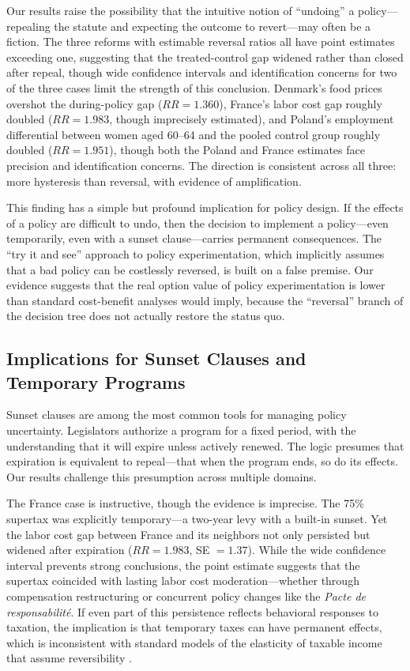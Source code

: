 \documentclass[12pt]{article}
\begin{document}
Our results raise the possibility that the intuitive notion of ``undoing'' a policy---repealing the statute and expecting the outcome to revert---may often be a fiction. The three reforms with estimable reversal ratios all have point estimates exceeding one, suggesting that the treated-control gap widened rather than closed after repeal, though wide confidence intervals and identification concerns for two of the three cases limit the strength of this conclusion. Denmark's food prices overshot the during-policy gap ($RR = 1.360$), France's labor cost gap roughly doubled ($RR = 1.983$, though imprecisely estimated), and Poland's employment differential between women aged 60--64 and the pooled control group roughly doubled ($RR = 1.951$), though both the Poland and France estimates face precision and identification concerns. The direction is consistent across all three: more hysteresis than reversal, with evidence of amplification.

This finding has a simple but profound implication for policy design. If the effects of a policy are difficult to undo, then the decision to implement a policy---even temporarily, even with a sunset clause---carries permanent consequences. The ``try it and see'' approach to policy experimentation, which implicitly assumes that a bad policy can be costlessly reversed, is built on a false premise. Our evidence suggests that the real option value of policy experimentation is lower than standard cost-benefit analyses would imply, because the ``reversal'' branch of the decision tree does not actually restore the status quo.

\subsection{Implications for Sunset Clauses and Temporary Programs}

Sunset clauses are among the most common tools for managing policy uncertainty. Legislators authorize a program for a fixed period, with the understanding that it will expire unless actively renewed. The logic presumes that expiration is equivalent to repeal---that when the program ends, so do its effects. Our results challenge this presumption across multiple domains.

The France case is instructive, though the evidence is imprecise. The 75\% supertax was explicitly temporary---a two-year levy with a built-in sunset. Yet the labor cost gap between France and its neighbors not only persisted but widened after expiration ($RR = 1.983$, SE $= 1.37$). While the wide confidence interval prevents strong conclusions, the point estimate suggests that the supertax coincided with lasting labor cost moderation---whether through compensation restructuring or concurrent policy changes like the \textit{Pacte de responsabilit\'{e}}. If even part of this persistence reflects behavioral responses to taxation, the implication is that temporary taxes can have permanent effects, which is inconsistent with standard models of the elasticity of taxable income that assume reversibility \citep{saez2012elasticity}.
\end{document}
